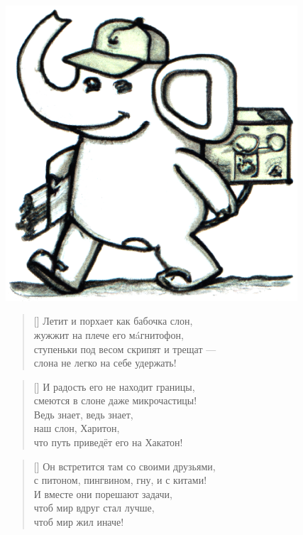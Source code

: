 \documentclass[14pt]{memoir}
\begin{document}
\begin{center}
\includegraphics[height=11cm]{images/hariton.png} 
\end{center}
\newpage

\begin{verse}[\versewidth]
Летит и порхает как бабочка слон,\\
жужжит на плече его мáгнитофон,\\
ступеньки под весом скрипят и трещат --- \\
слона не легко на себе удержать!
\end{verse}

\begin{verse}[\versewidth]
И радость его не находит границы,\\
смеются в слоне даже микрочастицы!\\
Ведь знает, ведь знает,\\
наш слон, Харитон,\\
что путь приведёт его на Хакатон!
\end{verse}

\begin{verse}[\versewidth]
Он встретится там со своими друзьями,\\
с питоном, пингвином, гну, и с китами!\\
И вместе они порешают задачи,\\
чтоб мир вдруг стал лучше,\\
чтоб мир жил иначе!
\end{verse}
\end{document}
